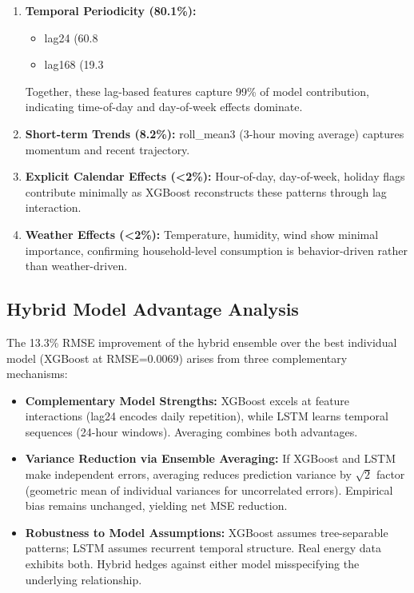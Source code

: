 \documentclass[11pt, a4paper, oneside]{article}
\begin{document}
\begin{enumerate}
    \item \textbf{Temporal Periodicity (80.1\%):} 
    \begin{itemize}
        \item lag24 (60.8%
        \item lag168 (19.3%
    \end{itemize}
    Together, these lag-based features capture 99\% of model contribution, indicating time-of-day and day-of-week effects dominate.
    
    \item \textbf{Short-term Trends (8.2\%):} 
    roll\_mean3 (3-hour moving average) captures momentum and recent trajectory.
    
    \item \textbf{Explicit Calendar Effects (<2\%):} 
    Hour-of-day, day-of-week, holiday flags contribute minimally as XGBoost reconstructs these patterns through lag interaction.
    
    \item \textbf{Weather Effects (<2\%):}
    Temperature, humidity, wind show minimal importance, confirming household-level consumption is behavior-driven rather than weather-driven.
\end{enumerate}

\subsection{Hybrid Model Advantage Analysis}

The 13.3\% RMSE improvement of the hybrid ensemble over the best individual model (XGBoost at RMSE=0.0069) arises from three complementary mechanisms:

\begin{itemize}
    \item \textbf{Complementary Model Strengths:} XGBoost excels at feature interactions (lag24 encodes daily repetition), while LSTM learns temporal sequences (24-hour windows). Averaging combines both advantages.
    
    \item \textbf{Variance Reduction via Ensemble Averaging:} If XGBoost and LSTM make independent errors, averaging reduces prediction variance by $\sqrt{2}$ factor (geometric mean of individual variances for uncorrelated errors). Empirical bias remains unchanged, yielding net MSE reduction.
    
    \item \textbf{Robustness to Model Assumptions:} XGBoost assumes tree-separable patterns; LSTM assumes recurrent temporal structure. Real energy data exhibits both. Hybrid hedges against either model misspecifying the underlying relationship.
\end{itemize}
\end{document}

